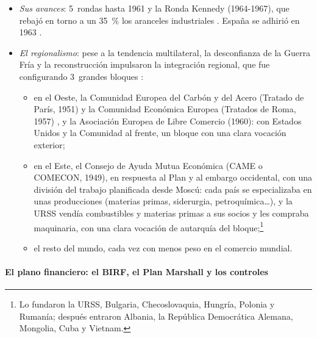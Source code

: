 \documentclass[11pt]{article}
\begin{document}
\begin{itemize}
\begin{enumerate}
  \item \emph{prohibición de las restricciones cuantitativas} (art.~XI), con excepciones (agricultura, balanza de pagos).
  \end{enumerate}
\item \emph{Sus avances}: 5~rondas hasta 1961 y la Ronda Kennedy (1964-1967), que rebajó en torno a un 35~\% los aranceles industriales . España se adhirió en 1963 .
\item \emph{El regionalismo}: pese a la tendencia multilateral, la desconfianza de la Guerra Fría y la reconstrucción impulsaron la integración regional, que fue configurando 3~grandes bloques :
  \begin{itemize}
  \item en el Oeste, la Comunidad Europea del Carbón y del Acero (Tratado de París, 1951) y la Comunidad Económica Europea (Tratados de Roma, 1957) , y la Asociación Europea de Libre Comercio (1960): con Estados Unidos y la Comunidad al frente, un bloque con una clara vocación exterior;
  \item en el Este, el Consejo de Ayuda Mutua Económica (CAME o COMECON, 1949), en respuesta al Plan  y al embargo occidental, con una división del trabajo planificada desde Moscú: cada país se especializaba en unas producciones (materias primas, siderurgia, petroquímica\ldots), y la URSS vendía combustibles y materias primas a sus socios y les compraba maquinaria, con una clara vocación de autarquía del bloque;\footnote{Lo fundaron la URSS, Bulgaria, Checoslovaquia, Hungría, Polonia y Rumanía; después entraron Albania, la República Democrática Alemana, Mongolia, Cuba y Vietnam.}
  \item el resto del mundo, cada vez con menos peso en el comercio mundial.
  \end{itemize}
\end{itemize}

\paragraph{El plano financiero: el BIRF, el Plan Marshall y los controles}
\end{document}
